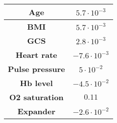\begin{tabular}{|c|c|}
\hline
\textbf{Age} & $5.7 \cdot 10^{-3}$\\
\hline 
\textbf{BMI} & $5.7 \cdot 10^{-3}$\\ 
\hline
\textbf{GCS} & $2.8 \cdot 10^{-3}$\\
\hline
\textbf{Heart rate} & $-7.6 \cdot 10^{-3}$  \\ 
\hline 
\textbf{Pulse pressure} &  $5 \cdot 10^{-2}$ \\ 
\hline 
\textbf{Hb level} &  $-4.5 \cdot 10^{-2}$ \\ 
\hline 
\textbf{O2 saturation} &  $0.11$ \\ 
\hline 
\textbf{Expander} & $-2.6 \cdot 10^{-2}$ \\
\hline 
\end{tabular} 
